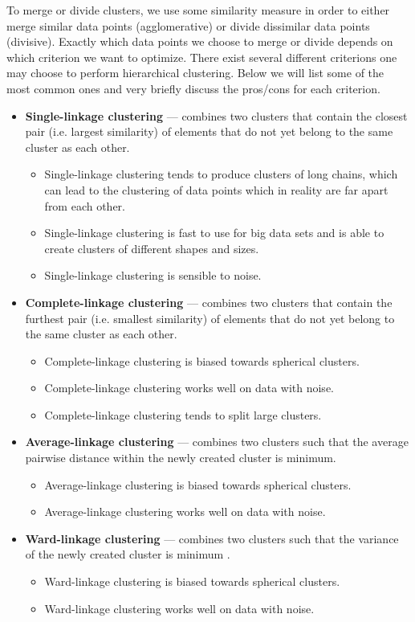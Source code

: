 To merge or divide clusters, we use some similarity measure in order to either merge similar data points (agglomerative) or divide dissimilar data points (divisive). Exactly which data points we choose to merge or divide depends on which criterion we want to optimize. There exist several different criterions one may choose to perform hierarchical clustering. Below we will list some of the most common ones and very briefly discuss the pros/cons for each criterion.
\begin{itemize}
    \item \textbf{Single-linkage clustering} --- combines two clusters that contain the closest pair (i.e. largest similarity) of elements that do not yet belong to the same cluster as each other.
    \begin{itemize}
        \item Single-linkage clustering tends to produce clusters of long chains, which can lead to the clustering of data points which in reality are far apart from each other.
        \item Single-linkage clustering is fast to use for big data sets and is able to create clusters of different shapes and sizes.
        \item Single-linkage clustering is sensible to noise.
    \end{itemize}
    \item \textbf{Complete-linkage clustering}  --- combines two clusters that contain the furthest pair (i.e. smallest similarity) of elements that do not yet belong to the same cluster as each other.
    \begin{itemize}
        \item Complete-linkage clustering is biased towards spherical clusters.
        \item Complete-linkage clustering works well on data with noise.
        \item Complete-linkage clustering tends to split large clusters.
    \end{itemize}
    \item \textbf{Average-linkage clustering} --- combines two clusters such that the average pairwise distance within the newly created cluster is minimum.
    \begin{itemize}
        \item Average-linkage clustering is biased towards spherical clusters.
        \item Average-linkage clustering works well on data with noise.
    \end{itemize}
    \item \textbf{Ward-linkage clustering} --- combines two clusters such that the variance of the newly created cluster is minimum \cite{Ward1963}.
    \begin{itemize}
        \item Ward-linkage clustering is biased towards spherical clusters.
        \item Ward-linkage clustering works well on data with noise.
    \end{itemize}
\end{itemize}

